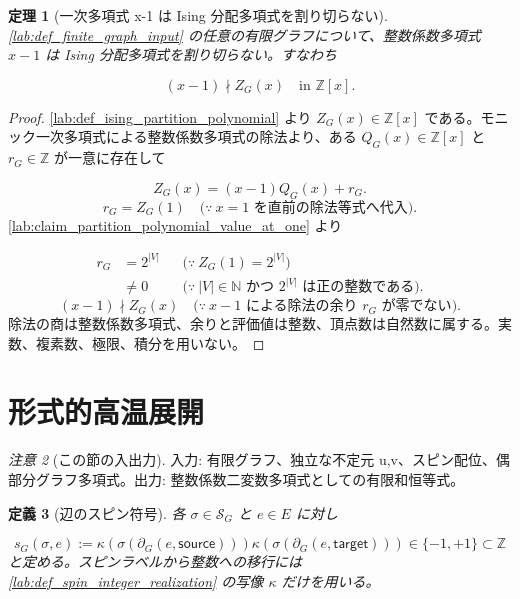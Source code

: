\documentclass[11pt,a4paper]{article}
\newtheorem{definition}{定義}[section]
\newtheorem{theorem}[definition]{定理}
\theoremstyle{remark}
\newtheorem{remark}[definition]{注意}
\begin{document}
\begin{theorem}[一次多項式 x-1 は Ising 分配多項式を割り切らない]\label{lab:theorem_no_linear_factor_x_minus_one}
\cref{lab:def_finite_graph_input}
 の任意の有限グラフについて、整数係数多項式 
$x-1$
 は Ising 分配多項式を割り切らない。すなわち

\[(x-1)\nmid Z_G(x)\quad\text{in }\mathbb Z[x].\]
\end{theorem}
\begin{proof}
\cref{lab:def_ising_partition_polynomial}
 より 
$Z_G(x)\in\mathbb Z[x]$
 である。モニック一次多項式による整数係数多項式の除法より、ある 
$Q_G(x)\in\mathbb Z[x]$
 と 
$r_G\in\mathbb Z$
 が一意に存在して

\[Z_G(x)=(x-1)Q_G(x)+r_G.\]
\[r_G
=Z_G(1)
\quad\bigl(\because\ x=1\text{ を直前の除法等式へ代入}\bigr).\]
\cref{lab:claim_partition_polynomial_value_at_one}
 より

\[\begin{aligned}
r_G
&=2^{|V|}
&&\bigl(\because\ Z_G(1)=2^{|V|}\bigr)\\
&\ne0
&&\bigl(\because\ |V|\in\mathbb N\text{ かつ }2^{|V|}\text{ は正の整数である}\bigr).
\end{aligned}\]
\[(x-1)\nmid Z_G(x)
\quad\bigl(\because\ x-1\text{ による除法の余り }r_G\text{ が零でない}\bigr).\]
除法の商は整数係数多項式、余りと評価値は整数、頂点数は自然数に属する。実数、複素数、極限、積分を用いない。

\end{proof}

\section{形式的高温展開}

\begin{remark}[この節の入出力]
入力: 有限グラフ、独立な不定元 u,v、スピン配位、偶部分グラフ多項式。出力: 整数係数二変数多項式としての有限和恒等式。

\end{remark}

\begin{definition}[辺のスピン符号]\label{lab:def_edge_spin_sign}
各 
$\sigma\in\mathcal S_G$
 と 
$e\in E$
 に対し

\[s_G(\sigma,e):=\kappa\!\left(\sigma\!\left(\partial_G(e,\mathsf{source})\right)\right)\kappa\!\left(\sigma\!\left(\partial_G(e,\mathsf{target})\right)\right)\in\{-1,+1\}\subset\mathbb Z\]
と定める。スピンラベルから整数への移行には 
\cref{lab:def_spin_integer_realization}
 の写像 
$\kappa$
 だけを用いる。

\end{definition}
\end{document}
